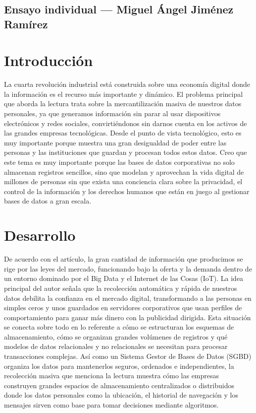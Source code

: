 %

\subsection*{Ensayo individual — Miguel Ángel Jiménez Ramírez}

\section*{Introducción}
La cuarta revolución industrial está construida sobre una economía digital donde la información es el recurso más importante y dinámico. El problema principal que aborda la lectura trata sobre la mercantilización masiva de nuestros datos personales, ya que generamos información sin parar al usar dispositivos electrónicos y redes sociales, convirtiéndonos sin darnos cuenta en los activos de las grandes empresas tecnológicas. Desde el punto de vista tecnológico, esto es muy importante porque muestra una gran desigualdad de poder entre las personas y las instituciones que guardan y procesan todos estos datos. Creo que este tema es muy importante porque las bases de datos corporativas no solo almacenan registros sencillos, sino que modelan y aprovechan la vida digital de millones de personas sin que exista una conciencia clara sobre la privacidad, el control de la información y los derechos humanos que están en juego al gestionar bases de datos a gran escala.

\section*{Desarrollo}
De acuerdo con el artículo, la gran cantidad de información que producimos se rige por las leyes del mercado, funcionando bajo la oferta y la demanda dentro de un entorno dominado por el Big Data y el Internet de las Cosas (IoT). La idea principal del autor señala que la recolección automática y rápida de nuestros datos debilita la confianza en el mercado digital, transformando a las personas en simples ceros y unos guardados en servidores corporativos que usan perfiles de comportamiento para ganar más dinero con la publicidad dirigida. Esta situación se conecta sobre todo en lo referente a cómo se estructuran los esquemas de almacenamiento, cómo se organizan grandes volúmenes de registros y qué modelos de datos relacionales y no relacionales se necesitan para procesar transacciones complejas. Así como un Sistema Gestor de Bases de Datos (SGBD) organiza los datos para mantenerlos seguros, ordenados e independientes, la recolección masiva que menciona la lectura muestra cómo las empresas construyen grandes espacios de almacenamiento centralizados o distribuidos donde los datos personales como la ubicación, el historial de navegación y los mensajes sirven como base para tomar decisiones mediante algoritmos.

